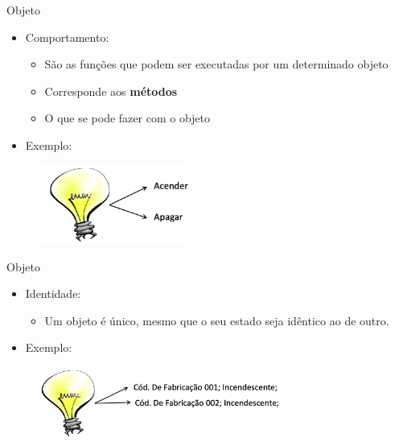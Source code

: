 \documentclass{beamer}
\begin{document}
\begin{frame}{Objeto}
    \begin{itemize}
        \item Comportamento:
        \begin{itemize}
            \item São as funções que podem ser executadas por um determinado objeto
            \item Corresponde aos \textbf{métodos}
            \item O que se pode fazer com o objeto
        \end{itemize}
        \item Exemplo:
    \end{itemize}
    \begin{figure}[H]
        \includegraphics[width=5cm]{Theme/Logos/lampada_comportamento.png}
    \end{figure}
\end{frame}

\begin{frame}{Objeto}
    \begin{itemize}
        \item Identidade:
        \begin{itemize}
            \item Um objeto é único, mesmo que o seu estado seja idêntico ao de outro.
        \end{itemize}
        \item Exemplo:
    \end{itemize}
    \begin{figure}[H]
        \includegraphics[width=8cm]{Theme/Logos/lampada_identidade.png}
    \end{figure}
\end{frame}
\end{document}
